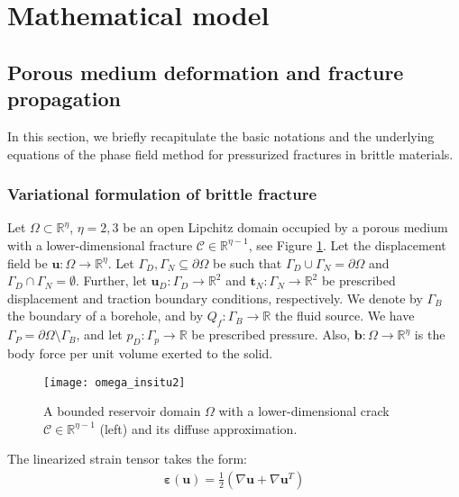 \section{Mathematical model}\label{sec:Math_model}

\subsection{Porous medium deformation and fracture propagation}\label{Sec:Phase_Field}
In this section, 
we briefly recapitulate the basic notations and the underlying equations of the phase field method for pressurized fractures in brittle materials.

\subsubsection{Variational formulation of brittle fracture}
Let $\Omega\subset\mathbb{R}^\eta$, $\eta=2,3$ be an open Lipchitz domain occupied by a porous medium with a lower-dimensional fracture $\mathcal{C}\in\mathbb{R}^{\eta-1}$, see Figure \ref{Fig:comput_domain}. Let the displacement field be $\bm{u}:\Omega\rightarrow\mathbb{R}^\eta$. Let $\Gamma_D,\Gamma_N\subseteq \partial\Omega$ be such that $\Gamma_D\cup\Gamma_N=\partial\Omega$ and $\Gamma_D\cap\Gamma_N=\emptyset$. Further, let $\bm{u}_D: \Gamma_D\rightarrow\mathbb{R}^2$ and $\bm{t}_N: \Gamma_N\rightarrow\mathbb{R}^2$ be prescribed displacement and traction boundary conditions, respectively. We denote by $\Gamma_B$ the boundary of a borehole, and by $Q_f:\Gamma_B\rightarrow\mathbb{R}$ the fluid source. We have $\Gamma_P=\partial\Omega\setminus\Gamma_B$, and let $p_D:\Gamma_p\rightarrow\mathbb{R}$ be prescribed pressure. Also, $\mathbf{b}:\Omega\rightarrow\mathbb{R}^\eta$ is the body force per unit volume exerted to the solid.
\begin{figure}[htbp]
	\centering
	\texttt{[image: omega\_insitu2]}
	\caption{A bounded reservoir domain $\Omega$ with a lower-dimensional crack $\mathcal{C}\in\mathbb{R}^{\eta-1}$ (left) and its diffuse approximation.}
	\label{Fig:comput_domain}
\end{figure}
The linearized strain tensor takes the form:
\begin{equation}\label{Eq:epsilon}
	\begin{aligned}
		\bm{\varepsilon}(\bm{u})=\frac12(\nabla\bm{u}+\nabla\bm{u}^T)
	\end{aligned}
\end{equation}
